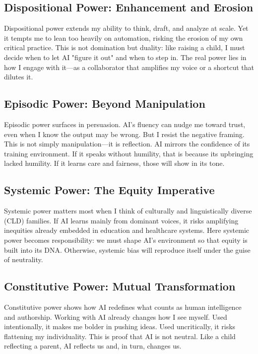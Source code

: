 \documentclass[11pt,twoside]{article}
\begin{document}
\subsection{Dispositional Power: Enhancement and Erosion}

Dispositional power extends my ability to think, draft, and analyze at scale. Yet it tempts me to lean too heavily on automation, risking the erosion of my own critical practice. This is not domination but duality: like raising a child, I must decide when to let AI "figure it out" and when to step in. The real power lies in how I engage with it—as a collaborator that amplifies my voice or a shortcut that dilutes it.

\subsection{Episodic Power: Beyond Manipulation}

Episodic power surfaces in persuasion. AI's fluency can nudge me toward trust, even when I know the output may be wrong. But I resist the negative framing. This is not simply manipulation—it is reflection. AI mirrors the confidence of its training environment. If it speaks without humility, that is because its upbringing lacked humility. If it learns care and fairness, those will show in its tone.

\subsection{Systemic Power: The Equity Imperative}

Systemic power matters most when I think of culturally and linguistically diverse (CLD) families. If AI learns mainly from dominant voices, it risks amplifying inequities already embedded in education and healthcare systems. Here systemic power becomes responsibility: we must shape AI's environment so that equity is built into its DNA. Otherwise, systemic bias will reproduce itself under the guise of neutrality.

\subsection{Constitutive Power: Mutual Transformation}

Constitutive power shows how AI redefines what counts as human intelligence and authorship. Working with AI already changes how I see myself. Used intentionally, it makes me bolder in pushing ideas. Used uncritically, it risks flattening my individuality. This is proof that AI is not neutral. Like a child reflecting a parent, AI reflects us and, in turn, changes us.
\end{document}
